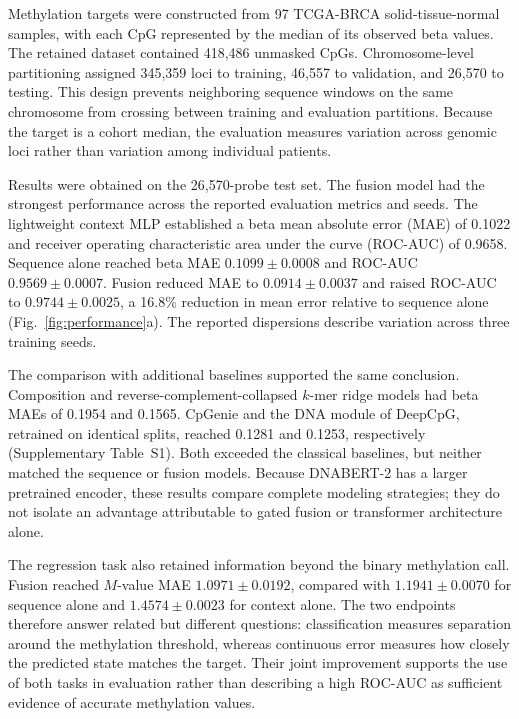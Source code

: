 \documentclass[11pt,letterpaper,twocolumn]{article}
\begin{document}
Methylation targets were constructed from 97 TCGA-BRCA solid-tissue-normal samples, with each CpG represented by the median of its observed beta values. The retained dataset contained 418,486 unmasked CpGs. Chromosome-level partitioning assigned 345,359 loci to training, 46,557 to validation, and 26,570 to testing. This design prevents neighboring sequence windows on the same chromosome from crossing between training and evaluation partitions. Because the target is a cohort median, the evaluation measures variation across genomic loci rather than variation among individual patients.

Results were obtained on the 26,570-probe test set. The fusion model had the strongest performance across the reported evaluation metrics and seeds. The lightweight context MLP established a beta mean absolute error (MAE) of 0.1022 and receiver operating characteristic area under the curve (ROC-AUC) of 0.9658. Sequence alone reached beta MAE $0.1099\pm0.0008$ and ROC-AUC $0.9569\pm0.0007$. Fusion reduced MAE to $0.0914\pm0.0037$ and raised ROC-AUC to $0.9744\pm0.0025$, a 16.8\% reduction in mean error relative to sequence alone (Fig.~\ref{fig:performance}a). The reported dispersions describe variation across three training seeds.

The comparison with additional baselines supported the same conclusion. Composition and reverse-complement-collapsed $k$-mer ridge models had beta MAEs of 0.1954 and 0.1565. CpGenie and the DNA module of DeepCpG, retrained on identical splits, reached 0.1281 and 0.1253, respectively (Supplementary Table~S1). Both exceeded the classical baselines, but neither matched the sequence or fusion models. Because DNABERT-2 has a larger pretrained encoder, these results compare complete modeling strategies; they do not isolate an advantage attributable to gated fusion or transformer architecture alone.

The regression task also retained information beyond the binary methylation call. Fusion reached $M$-value MAE $1.0971\pm0.0192$, compared with $1.1941\pm0.0070$ for sequence alone and $1.4574\pm0.0023$ for context alone. The two endpoints therefore answer related but different questions: classification measures separation around the methylation threshold, whereas continuous error measures how closely the predicted state matches the target. Their joint improvement supports the use of both tasks in evaluation rather than describing a high ROC-AUC as sufficient evidence of accurate methylation values.
\end{document}
